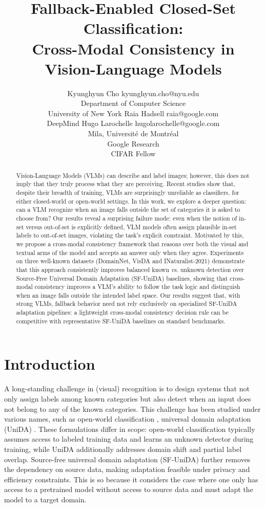 \documentclass[10pt]{article} %
\title{Fallback-Enabled Closed-Set Classification:\\Cross-Modal Consistency in Vision-Language Models}
\author{\name Kyunghyun Cho \email kyunghyun.cho@nyu.edu \\
      \addr Department of Computer Science\\
      University of New York
      \AND
      \name Raia Hadsell \email raia@google.com \\
      \addr DeepMind
      \AND
      \name Hugo Larochelle \email hugolarochelle@google.com\\
      \addr Mila, Universit\'e de Montr\'eal \\
      Google Research\\
      CIFAR Fellow}
\begin{document}
\maketitle

\begin{abstract}
Vision-Language Models (VLMs) can describe and label images; however, this does not imply that they truly process what they are perceiving.
Recent studies show that, despite their breadth of training, VLMs are surprisingly unreliable as classifiers, for either closed-world or open-world settings.
In this work, we explore a deeper question: can a VLM recognize when an image falls outside the set of categories it is asked to choose from? Our results reveal a surprising failure mode: even when the notion of in-set versus out-of-set is explicitly defined, VLM models often assign plausible in-set labels to out-of-set images, violating the task's explicit constraint.
Motivated by this, we propose a cross-modal consistency framework that reasons over both the visual and textual arms of the model and accepts an answer only when they agree.
Experiments on three well-known datasets (DomainNet, VisDA and INaturalist-2021) demonstrate that this approach consistently improves balanced known {\em vs.} unknown detection over Source-Free Universal Domain Adaptation (SF-UniDA) baselines, showing that cross-modal consistency improves a VLM’s ability to follow the task logic and distinguish when an image falls outside the intended label space. 
Our results suggest that, with strong VLMs, fallback behavior need not rely exclusively on specialized SF-UniDA adaptation pipelines: a lightweight cross-modal consistency decision rule can be competitive with representative SF-UniDA baselines on standard benchmarks.
\end{abstract}

\section{Introduction}

A long-standing challenge in (visual) recognition is to design systems that not only assign labels among known categories but also detect when an input does not belong to any of the known categories.
This challenge has been studied under various names, such as open-world classification \citep{ding2024improving, shu2017doc, fei-liu-2016-breaking}, universal domain adaptation (UniDA) \citep{you2019universal, chang2022unified, Saito_2021_ICCV, Choe_2025_CVPR}. These formulations differ in scope: open-world classification typically assumes access to labeled training data and learns an unknown detector during training, while UniDA additionally addresses domain shift and partial label overlap.
Source-free universal domain adaptation (SF-UniDA) \citep{UDA_2019_CVPR, liang2021umad} further removes the dependency on source data, making adaptation feasible under privacy and efficiency constraints.
This is so because it considers the case where one only has access to a pretrained model without access to source data and must adapt the model to a target domain.
\end{document}
